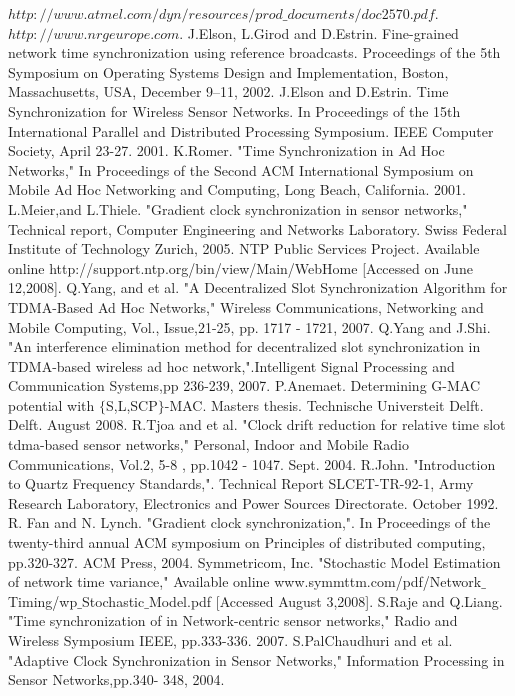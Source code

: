 \documentclass[a4paper,10pt]{report}
\begin{document}
\begin{thebibliography}{\textbf{References}}
$http://www.atmel.com/dyn/resources/prod\_documents/doc2570.pdf.$
$http://www.nrgeurope.com.$
J.Elson, L.Girod and D.Estrin. Fine-grained network time synchronization using reference broadcasts. Proceedings of the 5th Symposium on Operating Systems Design and Implementation, Boston, Massachusetts, USA, December 9–11, 2002.
J.Elson and D.Estrin. Time Synchronization for Wireless Sensor Networks. In Proceedings of the 15th International Parallel and Distributed Processing Symposium. IEEE Computer Society, April 23-27. 2001.
K.Romer. "Time Synchronization in Ad Hoc Networks," In Proceedings of the Second ACM International Symposium on Mobile Ad Hoc Networking and Computing, Long Beach, California. 2001.
L.Meier,and L.Thiele. "Gradient clock synchronization in sensor networks," Technical report, Computer Engineering and Networks Laboratory. Swiss Federal Institute of Technology Zurich, 2005.
NTP Public Services Project. Available online http://support.ntp.org/bin/view/Main/WebHome [Accessed on June 12,2008].
Q.Yang, and et al. "A Decentralized Slot Synchronization Algorithm for TDMA-Based Ad Hoc Networks," Wireless Communications, Networking and Mobile Computing, Vol., Issue,21-25, pp. 1717 - 1721, 2007.
Q.Yang and J.Shi. "An interference elimination method for decentralized slot synchronization in TDMA-based wireless ad hoc network,".Intelligent Signal Processing and Communication Systems,pp 236-239, 2007.
P.Anemaet. Determining G-MAC potential with $\{$S,L,SCP$\}$-MAC. Masters thesis. Technische Universteit Delft. Delft. August 2008.
R.Tjoa and et al. "Clock drift reduction for relative time slot tdma-based sensor networks," Personal, Indoor and Mobile Radio Communications, Vol.2, 5-8 , pp.1042 - 1047. Sept. 2004.
R.John. "Introduction to Quartz Frequency Standards,". Technical Report SLCET-TR-92-1, Army Research Laboratory, Electronics and Power Sources Directorate. October 1992.
R. Fan and N. Lynch. "Gradient clock synchronization,". In Proceedings of the twenty-third annual ACM symposium on Principles of distributed computing, pp.320-327. ACM Press, 2004.
Symmetricom, Inc. "Stochastic Model Estimation of network time variance," Available online www.symmttm.com/pdf/Network$\_$Timing/wp$\_$Stochastic$\_$Model.pdf [Accessed August 3,2008].
S.Raje and Q.Liang. "Time synchronization of in Network-centric sensor networks," Radio and Wireless Symposium IEEE, pp.333-336. 2007.
S.PalChaudhuri and et al. "Adaptive Clock Synchronization in Sensor Networks," Information Processing in Sensor Networks,pp.340- 348, 2004.
\end{thebibliography}
\end{document}

